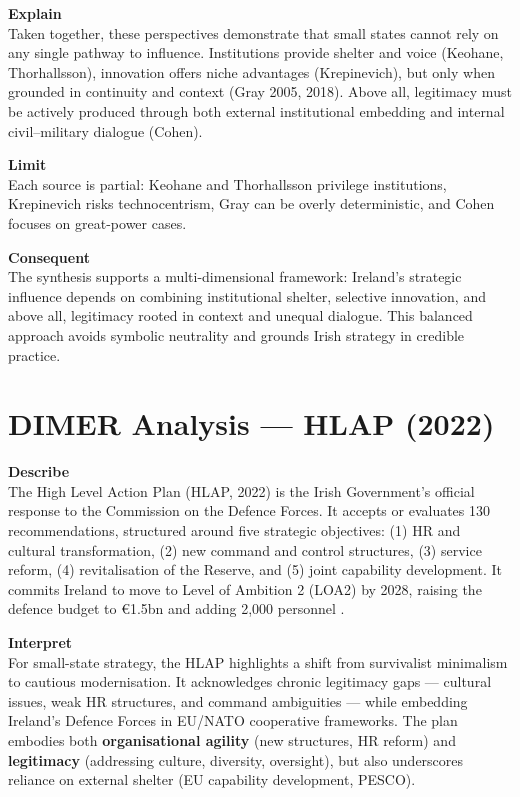\textbf{Explain} \\
Taken together, these perspectives demonstrate that small states cannot rely on any single pathway to influence. Institutions provide shelter and voice (Keohane, Thorhallsson), innovation offers niche advantages (Krepinevich), but only when grounded in continuity and context (Gray 2005, 2018). Above all, legitimacy must be actively produced through both external institutional embedding and internal civil--military dialogue (Cohen).  

\textbf{Limit} \\
Each source is partial: Keohane and Thorhallsson privilege institutions, Krepinevich risks technocentrism, Gray can be overly deterministic, and Cohen focuses on great-power cases.  

\textbf{Consequent} \\
The synthesis supports a multi-dimensional framework: Ireland’s strategic influence depends on combining institutional shelter, selective innovation, and above all, legitimacy rooted in context and unequal dialogue. This balanced approach avoids symbolic neutrality and grounds Irish strategy in credible practice.  


\section*{DIMER Analysis — HLAP (2022)}

\textbf{Describe} \\
The High Level Action Plan (HLAP, 2022) is the Irish Government’s official response to the Commission on the Defence Forces. It accepts or evaluates 130 recommendations, structured around five strategic objectives: (1) HR and cultural transformation, (2) new command and control structures, (3) service reform, (4) revitalisation of the Reserve, and (5) joint capability development. It commits Ireland to move to Level of Ambition 2 (LOA2) by 2028, raising the defence budget to €1.5bn and adding 2,000 personnel \parencite{HLAP_2022}.  

\textbf{Interpret} \\
For small-state strategy, the HLAP highlights a shift from survivalist minimalism to cautious modernisation. It acknowledges chronic legitimacy gaps — cultural issues, weak HR structures, and command ambiguities — while embedding Ireland’s Defence Forces in EU/NATO cooperative frameworks. The plan embodies both \textbf{organisational agility} (new structures, HR reform) and \textbf{legitimacy} (addressing culture, diversity, oversight), but also underscores reliance on external shelter (EU capability development, PESCO).  

